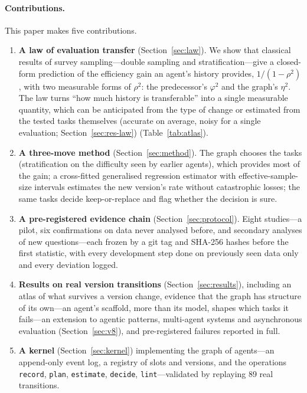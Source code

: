 \documentclass[11pt]{article}
\newcommand{\phisq}{\varphi^2}
\begin{document}
\paragraph{Contributions.} This paper makes five contributions.
\begin{enumerate}
\item \textbf{A law of evaluation transfer} (Section~\ref{sec:law}). We show that classical results of survey
sampling---double sampling \citep{neyman1938,cochran1977} and stratification---give a closed-form prediction of
the efficiency gain an agent's history provides, $1/(1-\rho^2)$, with two measurable forms of $\rho^2$: the
predecessor's $\phisq$ and the graph's $\eta^2$. The law turns ``how much history is transferable'' into a single
measurable quantity, which can be anticipated from the type of change or estimated from the tested tasks themselves
(accurate on average, noisy for a single evaluation; Section~\ref{sec:res-law})
(Table~\ref{tab:atlas}).
\item \textbf{A three-move method} (Section~\ref{sec:method}). The graph chooses the tasks (stratification on the
difficulty seen by earlier agents), which provides most of the gain; a cross-fitted generalised regression estimator
\citep{sarndal1992,zrnic2024cross} with effective-sample-size intervals \citep{korn1998} estimates the new version's
rate without catastrophic losses; the same tasks decide keep-or-replace and flag whether the decision is sure.
\item \textbf{A pre-registered evidence chain} (Section~\ref{sec:protocol}). Eight studies---a pilot, six
confirmations on data never analysed before, and secondary analyses of new questions---each frozen by a git tag and SHA-256 hashes before the first
statistic, with every development step done on previously seen data only and every deviation logged.
\item \textbf{Results on \NConf{} real version transitions} (Section~\ref{sec:results}), including an atlas of
what survives a version change, evidence that the graph has structure of its own---an agent's scaffold, more than its
model, shapes which tasks it fails---an extension to agentic patterns, multi-agent systems and asynchronous evaluation
(Section~\ref{sec:v8}), and \HypFailed{} pre-registered failures reported in full.
\item \textbf{A kernel} (Section~\ref{sec:kernel}) implementing the graph of agents---an append-only event log, a
registry of slots and versions, and the operations \texttt{record}, \texttt{plan}, \texttt{estimate},
\texttt{decide}, \texttt{lint}---validated by replaying 89 real transitions.
\end{enumerate}
\end{document}
